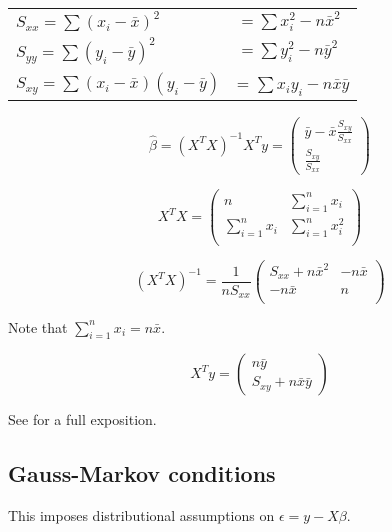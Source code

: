 \begin{tabular}{@{}ll@{}}
$S_{xx} = \sum (x_i - \bar{x})^2$  & $= \sum x_i^2 - n\bar{x}^2$ \\
$S_{yy} = \sum (y_i - \bar{y})^2$ & $= \sum y_i^2 - n\bar{y}^2$\\ 
$S_{xy} = \sum (x_i -\bar{x})(y_i -\bar{y})$ & = $\sum x_i y_i - n\bar{x}\bar{y}$\\
\end{tabular}

\begin{equation}
\hat{\beta} = (X^T X)^{-1} X^T y = 
\begin{pmatrix} 
\bar{y} - \bar{x} \frac{S_{xy}}{S_{xx}}\\
\frac{S_{xy}}{S_{xx}}
\end{pmatrix}
\end{equation}

\begin{equation}
X^T X = \begin{pmatrix}
n & \sum_{i=1}^n x_i\\
\sum_{i=1}^n x_i & \sum_{i=1}^n x_i^2\\
\end{pmatrix}
\end{equation}

\begin{equation}
(X^T X)^{-1} = \frac{1}{nS_{xx}} 
\begin{pmatrix}
 S_{xx}+n\bar{x}^2 & -n\bar{x} \\
 -n\bar{x} & n\\
\end{pmatrix}
\end{equation}

\noindent
Note that $\sum_{i=1}^n x_i = n\bar{x}$.

\begin{equation}
X^T  y = \begin{pmatrix}
n\bar{y} \\
S_{xy} + n\bar{x}\bar{y}
\end{pmatrix}
\end{equation}


See \cite[25]{DraperSmith} for a full exposition.

\subsection{Gauss-Markov conditions}

This imposes distributional assumptions on $\epsilon = y - X \beta$.

